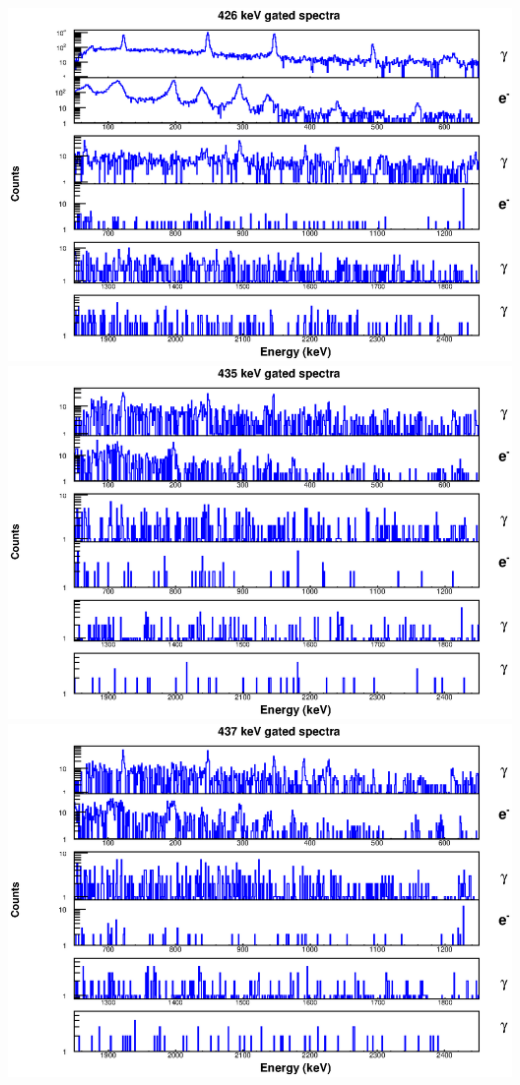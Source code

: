 \begin{landscape}
\includegraphics[scale=1.1]{154Gd_Appendix/426_combined.eps}
\includegraphics[scale=1.1]{154Gd_Appendix/435_combined.eps}
\includegraphics[scale=1.1]{154Gd_Appendix/437_combined.eps}

\end{landscape}
